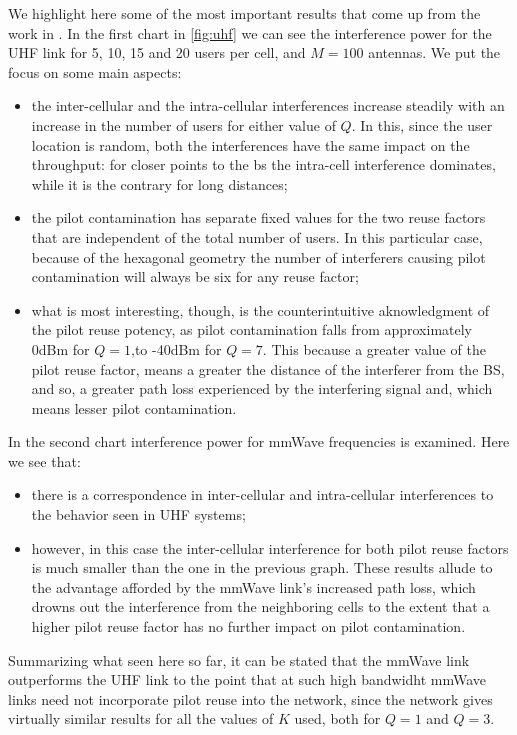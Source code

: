 \documentclass[11pt]{book}
\begin{document}
We highlight here some of the most important results that come up from the work in \cite{Ahsan2016}. In the first chart in \autoref{fig:uhf} we can see the interference power for the UHF link for 5, 10, 15 and 20 users per cell, and $M = 100$ antennas. We put the focus on some main aspects:
\begin{itemize}
  \item the inter-cellular and the intra-cellular interferences
  increase steadily with an increase in the number of users for
  either value of $Q$. In this, since the user location is random, both the interferences have the same impact on the throughput: for closer points to the \gls{bs} the intra-cell interference dominates, while it is the contrary for long distances;
  \item the pilot contamination has separate fixed values for the
  two reuse factors that are independent of the total number of users. In this particular case, because of the hexagonal geometry the number of interferers causing pilot contamination will always be six for any reuse factor;
  \item what is most interesting, though, is the counterintuitive aknowledgment of the pilot reuse potency, as pilot contamination falls from approximately 0dBm for $Q=1$,to -40dBm for $Q=7$. This because a greater value of the pilot reuse factor, means a greater the distance of the interferer from the BS, and so, a greater path loss experienced by
  the interfering signal and, which means lesser pilot contamination.
\end{itemize}
In the second chart interference power for mmWave frequencies is examined. Here we see that:
\begin{itemize}
  \item there is a correspondence in inter-cellular
and intra-cellular interferences to the behavior seen in UHF systems;
  \item however, in this case the inter-cellular interference for both pilot reuse factors is much smaller than the one in the previous graph. These results allude to the advantage afforded by the mmWave link’s increased path loss, which drowns out the interference from the neighboring cells to the extent that a higher pilot
  reuse factor has no further impact on pilot contamination.
\end{itemize}

Summarizing what seen here so far, it can be stated that the mmWave link outperforms the UHF link to the point that at such high bandwidht mmWave links need not incorporate pilot reuse into the network, since the network gives virtually similar results for all the values of $K$ used, both for $Q = 1$ and $Q=3$.



\end{document}

